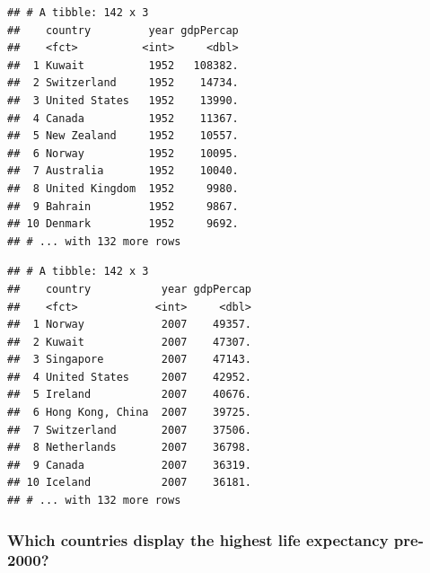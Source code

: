 \documentclass[]{article}
\newenvironment{Shaded}{\begin{snugshade}}{\end{snugshade}}
\newcommand{\KeywordTok}[1]{\textcolor[rgb]{0.13,0.29,0.53}{\textbf{#1}}}
\newcommand{\StringTok}[1]{\textcolor[rgb]{0.31,0.60,0.02}{#1}}
\newcommand{\CommentTok}[1]{\textcolor[rgb]{0.56,0.35,0.01}{\textit{#1}}}
\newcommand{\OperatorTok}[1]{\textcolor[rgb]{0.81,0.36,0.00}{\textbf{#1}}}
\newcommand{\NormalTok}[1]{#1}
\begin{document}
\begin{Shaded}
\end{Shaded}

\begin{verbatim}
## # A tibble: 142 x 3
##    country         year gdpPercap
##    <fct>          <int>     <dbl>
##  1 Kuwait          1952   108382.
##  2 Switzerland     1952    14734.
##  3 United States   1952    13990.
##  4 Canada          1952    11367.
##  5 New Zealand     1952    10557.
##  6 Norway          1952    10095.
##  7 Australia       1952    10040.
##  8 United Kingdom  1952     9980.
##  9 Bahrain         1952     9867.
## 10 Denmark         1952     9692.
## # ... with 132 more rows
\end{verbatim}

\begin{Shaded}
\end{Shaded}

\begin{verbatim}
## # A tibble: 142 x 3
##    country           year gdpPercap
##    <fct>            <int>     <dbl>
##  1 Norway            2007    49357.
##  2 Kuwait            2007    47307.
##  3 Singapore         2007    47143.
##  4 United States     2007    42952.
##  5 Ireland           2007    40676.
##  6 Hong Kong, China  2007    39725.
##  7 Switzerland       2007    37506.
##  8 Netherlands       2007    36798.
##  9 Canada            2007    36319.
## 10 Iceland           2007    36181.
## # ... with 132 more rows
\end{verbatim}

\subsubsection{Which countries display the highest life expectancy
pre-2000?}\label{which-countries-display-the-highest-life-expectancy-pre-2000}
\end{document}
